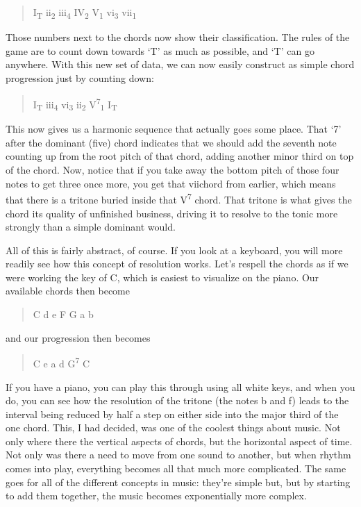 \begin{quote}I\textsubscript{T} ii\textsubscript{2} iii\textsubscript{4} IV\textsubscript{2} V\textsubscript{1} vi\textsubscript{3} vii\degree\textsubscript{1}\end{quote}

Those numbers next to the chords now show their classification.  The rules of the game are to count down towards `T' as much as possible, and `T' can go anywhere.  With this new set of data, we can now easily construct as simple chord progression just by counting down:

\begin{quote}I\textsubscript{T} iii\textsubscript{4} vi\textsubscript{3} ii\textsubscript{2} V\textsuperscript{7}\textsubscript{1} I\textsubscript{T}\end{quote}

This now gives us a harmonic sequence that actually goes some place.  That `7' after the dominant (five) chord indicates that we should add the seventh note counting up from the root pitch of that chord, adding another minor third on top of the chord.  Now, notice that if you take away the bottom pitch of those four notes to get three once more, you get that vii\degree chord from earlier, which means that there is a tritone buried inside that V\textsuperscript{7} chord.  That tritone is what gives the chord its quality of unfinished business, driving it to resolve to the tonic more strongly than a simple dominant would.  

All of this is fairly abstract, of course.  If you look at a keyboard, you will more readily see how this concept of resolution works.  Let's respell the chords as if we were working the key of C, which is easiest to visualize on the piano.  Our available chords then become

\begin{quote}C d e F G a b\degree\end{quote}

and our progression then becomes

\begin{quote}C e a d G\textsuperscript{7} C\end{quote}

If you have a piano, you can play this through using all white keys, and when you do, you can see how the resolution of the tritone (the notes b and f) leads to the interval being reduced by half a step on either side into the major third of the one chord.  This, I had decided, was one of the coolest things about music.  Not only where there the vertical aspects of chords, but the horizontal aspect of time.  Not only was there a need to move from one sound to another, but when rhythm comes into play, everything becomes all that much more complicated.  The same goes for all of the different concepts in music: they're simple but, but by starting to add them together, the music becomes exponentially more complex.

